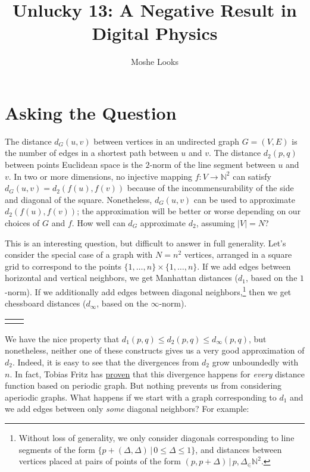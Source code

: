 \documentclass[letterpaper]{article}
\begin{document}
\title{Unlucky 13: A Negative Result in Digital Physics}
\author{Moshe Looks}

\maketitle

\section{Asking the Question}

The distance $d_G(u, v)$ between vertices in an undirected graph $G = (V, E)$ is the number
of edges in a shortest path between $u$ and $v$. The distance $d_2(p, q)$ between points
Euclidean space is the $2$-norm of the line segment between $u$ and $v$. In two or more
dimensions, no injective mapping $f : V \to \mathbb{N}^2$ can satisfy $d_G(u, v) = d_2(f(u),
f(v))$ because of the incommensurability of the side and diagonal of the square. Nonetheless,
$d_G(u, v)$ can be used to approximate $d_2(f(u), f(v))$; the approximation will be better or
worse depending on our choices of $G$ and $f$. How well can $d_G$ approximate $d_2$, assuming
$|V| = N$?

This is an interesting question, but difficult to answer in full generality. Let's consider
the special case of a graph with $N = n^2$ vertices, arranged in a square grid to correspond
to the points $\{1, \ldots, n\} \times \{1, \ldots, n\}$. If we add edges between horizontal
and vertical neighbors, we get Manhattan distances ($d_1$, based on the $1$-norm). If we
additionally add edges between diagonal neighbors,\footnote{Without loss of generality, we
only consider diagonals corresponding to line segments of the form $\{p + (\Delta, \Delta) \,
| \, 0 \leq \Delta \leq 1\}$, and distances between vertices placed at pairs of points of the
form $(p, p + \Delta) \, | \, p, \Delta _\in \mathbb{N}^2$.} then we get chessboard distances
($d_\infty$, based on the $\infty$-norm).

\setlength{\tabcolsep}{15pt}
\begin{tabular}{ l r}
   & 
\end{tabular}

We have the nice property that $d_1(p, q) \leq d_2(p, q) \leq d_\infty(p, q)$, but
nonetheless, neither one of these constructs gives us a very good approximation of
$d_2$. Indeed, it is easy to see that the divergences from $d_2$ grow unboundedly with $n$.
In fact, Tobias Fritz has \href{https://arxiv.org/abs/1109.1963}{proven} that this divergence
happens for \emph{every} distance function based on periodic graph. But nothing prevents us
from considering aperiodic graphs. What happens if we start with a graph corresponding to
$d_1$ and we add edges between only \emph{some} diagonal neighbors? For example:
\end{document}
